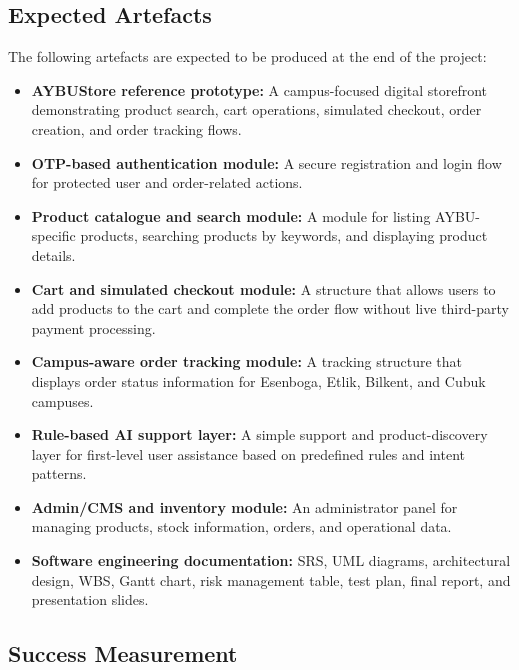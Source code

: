 \documentclass[11pt,a4paper]{article}
\begin{document}
\subsection{Expected Artefacts}
 
The following artefacts are expected to be produced at the end of the
project:
 
\begin{itemize}[leftmargin=*]
    \item \textbf{AYBUStore reference prototype:} A campus-focused
    digital storefront demonstrating product search, cart operations,
    simulated checkout, order creation, and order tracking flows.
 
    \item \textbf{OTP-based authentication module:} A secure
    registration and login flow for protected user and order-related
    actions.
 
    \item \textbf{Product catalogue and search module:} A module for
    listing AYBU-specific products, searching products by keywords, and
    displaying product details.
 
    \item \textbf{Cart and simulated checkout module:} A structure that
    allows users to add products to the cart and complete the order flow
    without live third-party payment processing.
 
    \item \textbf{Campus-aware order tracking module:} A tracking
    structure that displays order status information for Esenboga,
    Etlik, Bilkent, and Cubuk campuses.
 
    \item \textbf{Rule-based AI support layer:} A simple support and
    product-discovery layer for first-level user assistance based on
    predefined rules and intent patterns.
 
    \item \textbf{Admin/CMS and inventory module:} An administrator
    panel for managing products, stock information, orders, and
    operational data.
 
    \item \textbf{Software engineering documentation:} SRS, UML
    diagrams, architectural design, WBS, Gantt chart, risk management
    table, test plan, final report, and presentation slides.
\end{itemize}
 
\subsection{Success Measurement}
 
\end{document}
